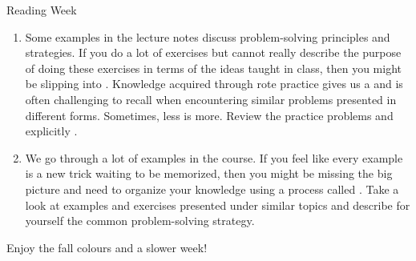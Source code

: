 \documentclass[../main.tex]{subfiles}
\begin{document}
\begin{lesson}{Reading Week}
\begin{enumerate}
    \item {} Some examples in the lecture notes discuss problem-solving principles and strategies. If you do a lot of exercises but cannot really describe the purpose of doing these exercises in terms of the ideas taught in class, then you might be slipping into . Knowledge acquired through rote practice gives us a  and is often challenging to recall when encountering similar problems presented in different forms. Sometimes, less is more. Review the practice problems and explicitly . 

    \item {} We go through a lot of examples in the course. If you feel like every example is a new trick waiting to be memorized, then you might be missing the big picture and need to organize your knowledge using a process called . Take a look at examples and exercises presented under similar topics and describe for yourself the common problem-solving strategy.
  \end{enumerate}


  \bigskip
  Enjoy the fall colours and a slower week! 
\end{lesson}
\end{document}
